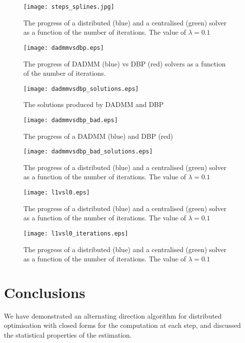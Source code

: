 \begin{figure}[h]
\centering
\texttt{[image: steps\_splines.jpg]}
\caption{The progress of a distributed (blue) and a centralised (green) solver as a function of the number of iterations. The value of \(\lambda = 0.1\)}
\label{fig:steps_splines}
\end{figure}

\begin{figure}[h]
\centering
\texttt{[image: dadmmvsdbp.eps]}
\caption{The progress of DADMM (blue) vs DBP (red) solvers as a function of the number of iterations. }
\label{fig:steps_splines}
\end{figure}

\begin{figure}[h]
\centering
\texttt{[image: dadmmvsdbp\_solutions.eps]}
\caption{The solutions produced by DADMM and DBP}
\label{fig:steps_splines}
\end{figure}

\begin{figure}[h]
\centering
\texttt{[image: dadmmvsdbp\_bad.eps]}
\caption{The progress of a DADMM (blue) and DBP (red) }
\label{fig:steps_splines}
\end{figure}

\begin{figure}[h]
\centering
\texttt{[image: dadmmvsdbp\_bad\_solutions.eps]}
\caption{The progress of a distributed (blue) and a centralised (green) solver as a function of the number of iterations. The value of \(\lambda = 0.1\)}
\label{fig:steps_splines}
\end{figure}

\begin{figure}[h]
\centering
\texttt{[image: l1vsl0.eps]}
\caption{The progress of a distributed (blue) and a centralised (green) solver as a function of the number of iterations. The value of \(\lambda = 0.1\)}
\label{fig:steps_splines}
\end{figure}

\begin{figure}[h]
\centering
\texttt{[image: l1vsl0\_iterations.eps]}
\caption{The progress of a distributed (blue) and a centralised (green) solver as a function of the number of iterations. The value of \(\lambda = 0.1\)}
\label{fig:steps_splines}
\end{figure}


\section{Conclusions}
We have demonstrated an alternating direction algorithm for distributed optimisation with closed forms for the computation at each step, and discussed the statistical properties of the estimation. 

